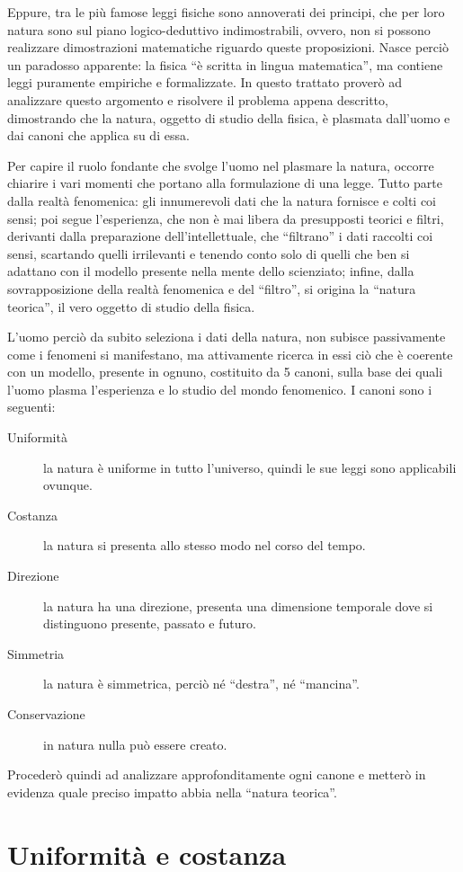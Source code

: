 \documentclass[11pt,a4paper]{article}
\begin{document}
Eppure, tra le più famose leggi fisiche sono annoverati dei principi, che per loro natura sono sul piano logico-deduttivo indimostrabili, ovvero, non si possono realizzare dimostrazioni matematiche riguardo queste proposizioni. Nasce perciò un paradosso apparente: la fisica “è scritta in lingua matematica”, ma contiene leggi puramente empiriche e formalizzate. In questo trattato proverò ad analizzare questo argomento e risolvere il problema appena descritto, dimostrando che la natura, oggetto di studio della fisica, è plasmata dall’uomo e dai canoni che applica su di essa. 

Per capire il ruolo fondante che svolge l’uomo nel plasmare la natura, occorre chiarire i vari momenti che portano alla formulazione di una legge. Tutto parte dalla realtà fenomenica: gli innumerevoli dati che la natura fornisce e colti coi sensi; poi segue l’esperienza, che non è mai libera da presupposti teorici e filtri, derivanti dalla preparazione dell’intellettuale, che “filtrano” i dati raccolti coi sensi, scartando quelli irrilevanti e tenendo conto solo di quelli che ben si adattano con il modello presente nella mente dello scienziato; infine, dalla sovrapposizione della realtà fenomenica e del “filtro”, si origina la “natura teorica”, il vero oggetto di studio della fisica. 

L’uomo perciò da subito seleziona i dati della natura, non subisce passivamente come i fenomeni si manifestano, ma attivamente ricerca in essi ciò che è coerente con un modello, presente in ognuno, costituito da 5 canoni, sulla base dei quali l’uomo plasma l’esperienza e lo studio del mondo fenomenico. I canoni sono i seguenti: 
\begin{description}
\item[Uniformità] la natura è uniforme in tutto l’universo, quindi le sue leggi sono applicabili ovunque.
\item[Costanza] la natura si presenta allo stesso modo nel corso del tempo.
\item[Direzione] la natura ha una direzione, presenta una dimensione temporale dove si distinguono presente, passato e futuro.
\item[Simmetria] la natura è simmetrica, perciò né “destra”, né “mancina”.
\item[Conservazione] in natura nulla può essere creato.
\end{description}
Procederò quindi ad analizzare approfonditamente ogni canone e metterò in evidenza quale preciso impatto abbia nella “natura teorica”. \section{Uniformità e costanza}
\end{document}

